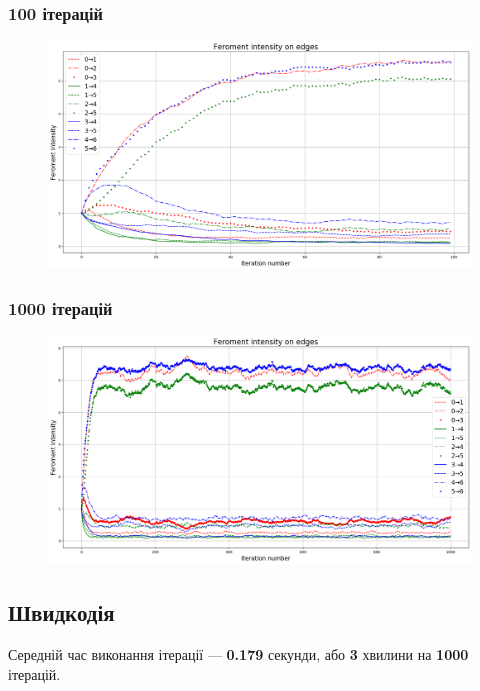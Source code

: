 \documentclass[a4paper, 12pt]{article}
\numberwithin{equation}{section}
\begin{document}
\subsubsection{100 ітерацій}

\begin{figure}[H]
    \centering
    \includegraphics[width=\textwidth]{../../code/salesman/feroment_100.png}
\end{figure}

\subsubsection{1000 ітерацій}

\begin{figure}[H]
    \centering
    \includegraphics[width=\textwidth]{../../code/salesman/feroment_1000.png}
\end{figure}

\subsection{Швидкодія}

Середній час виконання ітерації --- \textbf{0.179} секунди, або \textbf{3} хвилини на \textbf{1000} ітерацій. \medskip
\end{document}
